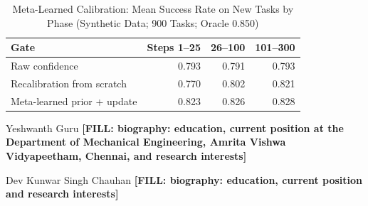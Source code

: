 \documentclass[journal]{IEEEtran}
\newcommand{\fillin}[1]{{\color{red}\bfseries [FILL: #1]}}
\begin{document}
\begin{table}[!t]
\centering
\caption{Meta-Learned Calibration: Mean Success Rate on New Tasks by Phase (Synthetic Data; 900 Tasks; Oracle 0.850)}\label{tab:metares}%
\footnotesize
\begin{tabular}{@{}lrrr@{}}
\toprule
\textbf{Gate} & \textbf{Steps 1--25} & \textbf{26--100} & \textbf{101--300} \\ \midrule
Raw confidence & 0.793 & 0.791 & 0.793 \\
Recalibration from scratch & 0.770 & 0.802 & 0.821 \\
Meta-learned prior + update & 0.823 & 0.826 & 0.828 \\
\bottomrule
\end{tabular}
\end{table}





\begin{IEEEbiographynophoto}{Yeshwanth Guru}
\fillin{biography: education, current position at the Department of Mechanical Engineering, Amrita Vishwa Vidyapeetham, Chennai, and research interests}
\end{IEEEbiographynophoto}

\begin{IEEEbiographynophoto}{Dev Kunwar Singh Chauhan}
\fillin{biography: education, current position and research interests}
\end{IEEEbiographynophoto}
\end{document}
